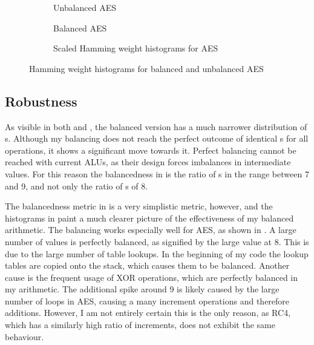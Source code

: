 \begin{figure}[hp]
  \centering
  \begin{subfigure}[b]{0.49\textwidth}
    
    \caption{Unbalanced AES}
  \end{subfigure}
  \begin{subfigure}[b]{0.49\textwidth}
    
    \caption{Balanced AES}
    \label{fig:aes-balanced}
  \end{subfigure}

  \begin{subfigure}[b]{\textwidth}
    
    \caption{Scaled Hamming weight histograms for AES}
    \label{fig:aes-comp}
  \end{subfigure}
  \caption{Hamming weight histograms for balanced and unbalanced AES}
  \label{fig:aes}
\end{figure}

\subsection{Robustness}
As visible in both  and , the balanced version has a much narrower distribution of \hammingw{}s.
Although my balancing does not reach the perfect outcome of identical \hammingw{}s for all operations, it shows a significant move towards it.
Perfect balancing cannot be reached with current ALUs, as their design forces imbalances in intermediate values.
For this reason the balancedness in  is the ratio of \hammingw{}s in the range between 7 and 9, and not only the ratio of \hammingw{}s of 8.

The balancedness metric in  is a very simplistic metric, however, and the histograms in  paint a much clearer picture of the effectiveness of my balanced arithmetic.
The balancing works especially well for AES, as shown in .
A large number of values is perfectly balanced, as signified by the large value at 8.
This is due to the large number of table lookups.
In the beginning of my code the lookup tables are copied onto the stack, which causes them to be balanced.
Another cause is the frequent usage of XOR operations, which are perfectly balanced in my arithmetic.
The additional spike around 9 is likely caused by the large number of loops in AES, causing a many increment operations and therefore additions.
However, I am not entirely certain this is the only reason, as RC4, which has a similarly high ratio of increments, does not exhibit the same behaviour.

